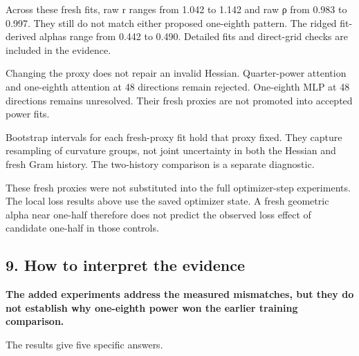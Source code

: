 \documentclass[
  14pt,
  letterpaper,
]{extarticle}
\begin{document}
Across these fresh fits, raw r ranges from 1.042 to 1.142 and raw ρ from
0.983 to 0.997. They still do not match either proposed one-eighth
pattern. The ridged fit-derived alphas range from 0.442 to 0.490.
Detailed fits and direct-grid checks are included in the evidence.

Changing the proxy does not repair an invalid Hessian. Quarter-power
attention and one-eighth attention at 48 directions remain rejected.
One-eighth MLP at 48 directions remains unresolved. Their fresh proxies
are not promoted into accepted power fits.

Bootstrap intervals for each fresh-proxy fit hold that proxy fixed. They
capture resampling of curvature groups, not joint uncertainty in both
the Hessian and fresh Gram history. The two-history comparison is a
separate diagnostic.

These fresh proxies were not substituted into the full optimizer-step
experiments. The local loss results above use the saved optimizer state.
A fresh geometric alpha near one-half therefore does not predict the
observed loss effect of candidate one-half in those controls.

\subsection{9. How to interpret the
evidence}\label{how-to-interpret-the-evidence}

\textbf{The added experiments address the measured mismatches, but they
do not establish why one-eighth power won the earlier training
comparison.}

The results give five specific answers.
\end{document}

